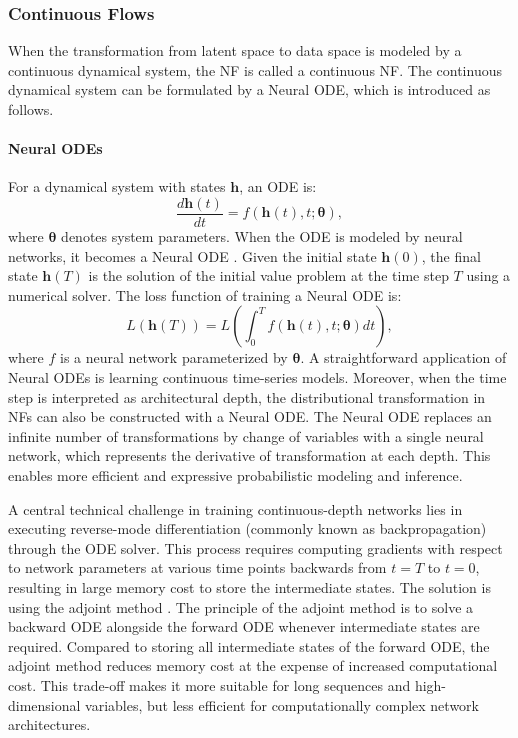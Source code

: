 \subsubsection{Continuous Flows}
When the transformation from latent space to data space is modeled by a continuous dynamical system, the \ac{NF} is called a continuous \ac{NF}. The continuous dynamical system can be formulated by a Neural \ac{ODE}, which is introduced as follows.
\label{sec:cnf}
\paragraph{Neural \acp{ODE}}
For a dynamical system with states $\boldsymbol{h}$, an \ac{ODE} is:
\begin{equation}
    \frac{d\boldsymbol{h}(t)}{dt} = f(\boldsymbol{h}(t), t; \boldsymbol{\theta}),
\end{equation}
where $\boldsymbol{\theta}$ denotes system parameters. When the \ac{ODE} is modeled by neural networks, it becomes a Neural \ac{ODE} \citep{chen2019node}. Given the initial state $\boldsymbol{h}(0)$, the final state $\boldsymbol{h}(T)$ is the solution of the initial value problem at the time step $T$ using a numerical solver. The loss function of training a Neural \ac{ODE} is:
\begin{equation}
    L(\boldsymbol{h}(T))=L(\int_0^Tf(\boldsymbol{h}(t), t; \boldsymbol{\theta})dt),
\end{equation}
where $f$ is a neural network parameterized by $\boldsymbol{\theta}$.
A straightforward application of Neural \acp{ODE} is learning continuous time-series models. Moreover, when the time step is interpreted as architectural depth, the distributional transformation in \acp{NF} can also be constructed with a Neural \ac{ODE}. The Neural \ac{ODE} replaces an infinite number of transformations by change of variables with a single neural network, which represents the derivative of transformation at each depth. This enables more efficient and expressive probabilistic modeling and inference.

A central technical challenge in training continuous-depth networks lies in executing reverse-mode differentiation (commonly known as backpropagation) through the ODE solver. This process requires computing gradients with respect to network parameters at various time points backwards from $t=T$ to $t=0$, resulting in large memory cost to store the intermediate states. The solution is using the adjoint method \citep{Bittner1963, adjoint1963}. The principle of the adjoint method is to solve a backward \ac{ODE} alongside the forward \ac{ODE} whenever intermediate states are required. Compared to storing all intermediate states of the forward \ac{ODE}, the adjoint method reduces memory cost at the expense of increased computational cost. This trade-off makes it more suitable for long sequences and high-dimensional variables, but less efficient for computationally complex network architectures.

